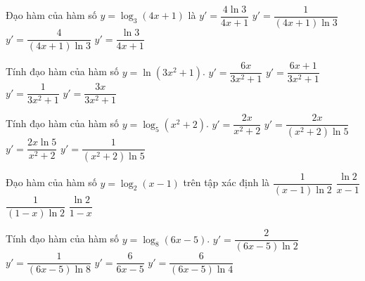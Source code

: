 \begin{ex}%
	Đạo hàm của hàm số $y=\log_3\left(4x+1\right)$ là
	\choice
	{$y'=\dfrac{4\ln 3}{4x+1}$}
	{$y'=\dfrac{1}{\left(4x+1\right)\ln 3}$}
	{\True $y'=\dfrac{4}{\left(4x+1\right)\ln 3}$}
	{$y'=\dfrac{\ln 3}{4x+1}$}
\end{ex}

\begin{ex}%
	Tính đạo hàm của hàm số $y=\ln \left(3x^2+1\right)$.
	\choice
	{\True $y'=\dfrac{6x}{3x^2+1}$}
	{$y'=\dfrac{6x+1}{3x^2+1}$}
	{$y'=\dfrac{1}{3x^2+1}$}
	{$y'=\dfrac{3x}{3x^2+1}$}
\end{ex}

\begin{ex}%
	Tính đạo hàm của hàm số $y=\log_5\left(x^2+2\right)$.
	\choice
	{$y'=\dfrac{2x}{x^2+2}$}
	{\True $y'=\dfrac{2x}{\left(x^2+2\right)\ln 5}$}
	{$y'=\dfrac{2x\ln 5}{x^2+2}$}
	{$y'=\dfrac{1}{\left(x^2+2\right)\ln 5}$}
\end{ex}

\begin{ex}%
	Đạo hàm của hàm số $y=\log_2\left(x-1\right)$ trên tập xác định là
	\choice
	{\True $\dfrac{1}{\left(x-1\right)\ln 2}$}
	{$\dfrac{\ln 2}{x-1}$}
	{$\dfrac{1}{\left(1-x\right)\ln 2}$}
	{$\dfrac{\ln 2}{1-x}$}
\end{ex}

\begin{ex}%
	Tính đạo hàm của hàm số $y=\log_8\left(6x-5\right)$.
	\choice
	{\True $y'=\dfrac{2}{\left(6x-5\right)\ln 2}$}
	{$y'=\dfrac{1}{\left(6x-5\right)\ln 8}$}
	{$y'=\dfrac{6}{6x-5}$}
	{$y'=\dfrac{6}{\left(6x-5\right)\ln 4}$}
\end{ex}

